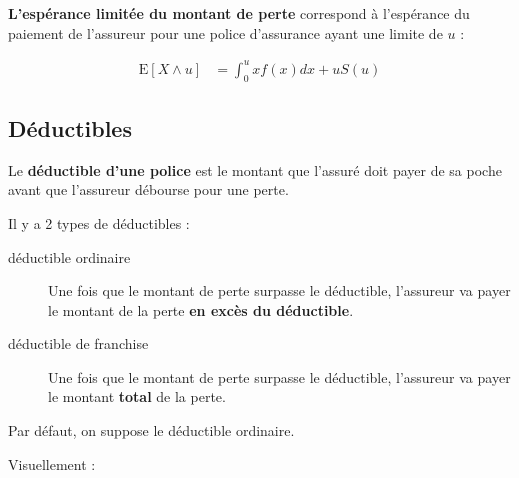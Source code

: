 \documentclass[french]{article}
\begin{document}
\begin{multicols*}{2}
\begin{definitionNOHFILLsub}
\begin{center}
\begin{tikzpicture}[x=0.75pt,y=0.75pt,yscale=-1,xscale=1]
\end{tikzpicture}
\end{center}
\end{definitionNOHFILLsub}

\begin{definitionNOHFILLsub}
\textbf{L'espérance limitée du montant de perte}  correspond à l'espérance du paiement de l'assureur pour une police d'assurance ayant une limite de $u$ :

\begin{align*}
	\text{E}[X \wedge u]	
	&=	\int_{0}^{u} x f(x) dx + u S(u)
\end{align*}
\end{definitionNOHFILLsub}


\columnbreak
\subsection{Déductibles}
\begin{definitionNOHFILL}[Déductible]
Le \textbf{déductible d'une police} est le montant que l'assuré doit payer de sa poche avant que l'assureur débourse pour une perte. 

\bigskip

Il y a 2 types de déductibles : 
\begin{description}
	\item[déductible ordinaire]	Une fois que le montant de perte surpasse le déductible, l'assureur va payer le montant de la perte \textbf{en excès du déductible}.
	\item[déductible de franchise]	Une fois que le montant de perte surpasse le déductible, l'assureur va payer le montant \textbf{total} de la perte.
\end{description}

Par défaut, on suppose le déductible ordinaire.

\bigskip

Visuellement :

\begin{center}
\begin{tikzpicture}[x=0.75pt,y=0.75pt,yscale=-1,xscale=1]


\end{tikzpicture}
\end{center}
\end{definitionNOHFILL}
\end{multicols*}
\end{document}

